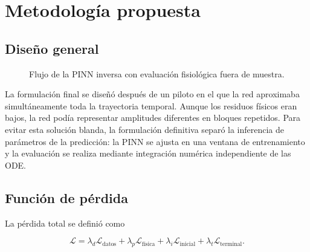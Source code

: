 \section{Metodología propuesta}

\subsection{Diseño general}

\begin{figure}[H]
\centering
{}
\caption{Flujo de la PINN inversa con evaluación fisiológica fuera de muestra.}
\label{fig:method_flow}
\end{figure}

La formulación final se diseñó después de un piloto en el que la red aproximaba simultáneamente toda la trayectoria temporal. Aunque los residuos físicos eran bajos, la red podía representar amplitudes diferentes en bloques repetidos. Para evitar esta solución blanda, la formulación definitiva separó la inferencia de parámetros de la predicción: la PINN se ajusta en una ventana de entrenamiento y la evaluación se realiza mediante integración numérica independiente de las ODE.

\subsection{Función de pérdida}

La pérdida total se definió como

\begin{equation}
\mathcal{L}=\lambda_d\mathcal{L}_{\mathrm{datos}}+
\lambda_p\mathcal{L}_{\mathrm{física}}+
\lambda_i\mathcal{L}_{\mathrm{inicial}}+
\lambda_t\mathcal{L}_{\mathrm{terminal}}.
\end{equation}

